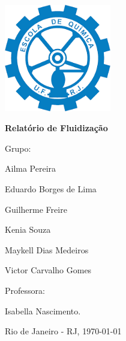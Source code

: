 \begin{titlepage}
	\centering
	\includegraphics[width=0.35\textwidth,trim={0 0 0 4cm}]{figuras/capa/index.png}\par\vspace{1cm}
	{\LARGE\bfseries Relatório de Fluidização}\par
	\vspace{0.1cm}
	{\Large Grupo:\par}
	\vspace{0.01cm}
	{\Large Ailma Pereira \par}
	{\Large Eduardo Borges de Lima\par}
	{\Large Guilherme Freire \par}
	{\Large Kenia Souza \par}
	{\Large Maykell Dias Medeiros\par}
	{\Large Victor Carvalho Gomes \par}
	{\Large \par}
	\vspace{0.2cm}
	\vspace{1cm}
	{\Large Professora:\par}
	\vspace{0.01cm}
	{\large Isabella Nascimento.\par}
	\vfill
	
	{\large Rio de Janeiro - RJ, \today\par}
\end{titlepage}